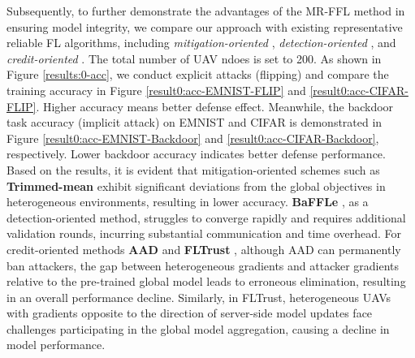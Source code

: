 \documentclass[lettersize,journal]{IEEEtran}
\begin{document}

Subsequently, to further demonstrate the advantages of the MR-FFL method in ensuring model integrity, we compare our approach with existing representative reliable FL algorithms, including \textit{mitigation-oriented} \cite{blanchard2017machine-krum,yin2018byzantine-trimmedmean}, \textit{detection-oriented} \cite{andreina2021baffle}, and \textit{credit-oriented} \cite{li2019abnormal,cao2020fltrust}. The total number of UAV ndoes is set to 200. As shown in Figure \ref{results:0-acc}, we conduct explicit attacks (flipping) and compare the training accuracy in Figure \ref{result0:acc-EMNIST-FLIP} and \ref{result0:acc-CIFAR-FLIP}. Higher accuracy means better defense effect. Meanwhile, the backdoor task accuracy (implicit attack) on EMNIST and CIFAR is demonstrated in Figure \ref{result0:acc-EMNIST-Backdoor} and \ref{result0:acc-CIFAR-Backdoor}, respectively. Lower backdoor accuracy indicates better defense performance. 
Based on the results, it is evident that mitigation-oriented schemes such as \textbf{Trimmed-mean} \cite{yin2018byzantine-trimmedmean} exhibit significant deviations from the global objectives in heterogeneous environments, resulting in lower accuracy. \textbf{BaFFLe} \cite{andreina2021baffle}, as a detection-oriented method, struggles to converge rapidly and requires additional validation rounds, incurring substantial communication and time overhead. For credit-oriented methods \textbf{AAD} \cite{li2019abnormal} and \textbf{FLTrust} \cite{cao2020fltrust}, although AAD can permanently ban attackers, the gap between heterogeneous gradients and attacker gradients relative to the pre-trained global model leads to erroneous elimination, resulting in an overall performance decline. Similarly, in FLTrust, heterogeneous UAVs with gradients opposite to the direction of server-side model updates face challenges participating in the global model aggregation, causing a decline in model performance.
\end{document}
